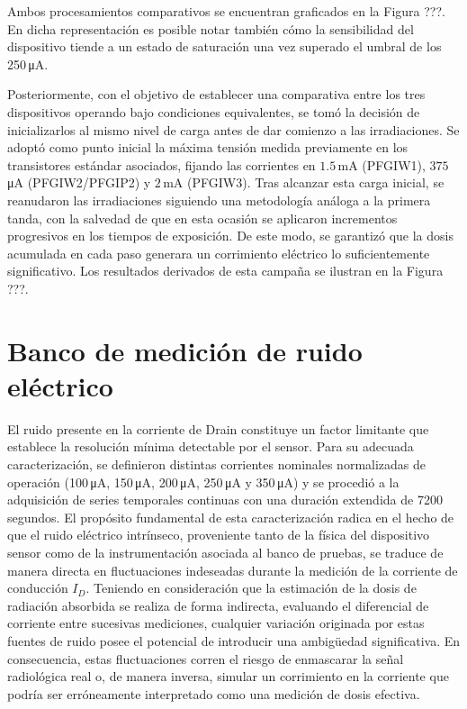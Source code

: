 \documentclass[12pt,a4paper,oneside]{book}
\begin{document}
Ambos procesamientos comparativos se encuentran graficados en la Figura ???. En dicha representación es posible notar también cómo la sensibilidad del dispositivo tiende a un estado de saturación una vez superado el umbral de los 250\,\si{\micro\ampere}.

Posteriormente, con el objetivo de establecer una comparativa entre los tres dispositivos operando bajo condiciones equivalentes, se tomó la decisión de inicializarlos al mismo nivel de carga antes de dar comienzo a las irradiaciones. Se adoptó como punto inicial la máxima tensión medida previamente en los transistores estándar asociados, fijando las corrientes en $1.5$\,\si{\milli\ampere} (PFGIW1), $375$\,\si{\micro\ampere} (PFGIW2/PFGIP2) y $2$\,\si{\milli\ampere} (PFGIW3). 
Tras alcanzar esta carga inicial, se reanudaron las irradiaciones siguiendo una metodología análoga a la primera tanda, con la salvedad de que en esta ocasión se aplicaron incrementos progresivos en los tiempos de exposición. De este modo, se garantizó que la dosis acumulada en cada paso generara un corrimiento eléctrico lo suficientemente significativo. Los resultados derivados de esta campaña se ilustran en la Figura ???.

\section{Banco de medición de ruido eléctrico}
El ruido presente en la corriente de Drain constituye un factor limitante que establece la resolución mínima detectable por el sensor. Para su adecuada caracterización, se definieron distintas corrientes nominales normalizadas de operación (100\,\si{\micro\ampere}, 150\,\si{\micro\ampere}, 200\,\si{\micro\ampere}, 250\,\si{\micro\ampere} y 350\,\si{\micro\ampere}) y se procedió a la adquisición de series temporales continuas con una duración extendida de 7200 segundos.
El propósito fundamental de esta caracterización radica en el hecho de que el ruido eléctrico intrínseco, proveniente tanto de la física del dispositivo sensor como de la instrumentación asociada al banco de pruebas, se traduce de manera directa en fluctuaciones indeseadas durante la medición de la corriente de conducción $I_D$. Teniendo en consideración que la estimación de la dosis de radiación absorbida se realiza de forma indirecta, evaluando el diferencial de corriente entre sucesivas mediciones, cualquier variación originada por estas fuentes de ruido posee el potencial de introducir una ambigüedad significativa. En consecuencia, estas fluctuaciones corren el riesgo de enmascarar la señal radiológica real o, de manera inversa, simular un corrimiento en la corriente que podría ser erróneamente interpretado como una medición de dosis efectiva.
\end{document}
